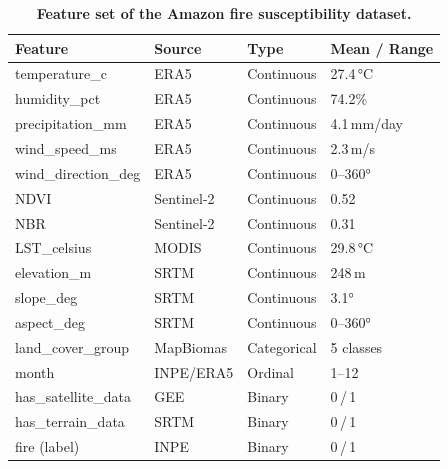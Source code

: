 \documentclass{ieeeaccess}
\begin{document}
\begin{table}[p]
\caption{\textbf{Feature set of the Amazon fire susceptibility dataset.}}
\label{tab:dataset}
\centering
\renewcommand{\arraystretch}{1.2}
\begin{tabularx}{\columnwidth}{|X|l|l|l|}
\hline
\textbf{Feature} & \textbf{Source} & \textbf{Type} & \textbf{Mean / Range} \\
\hline
temperature\_c       & ERA5        & Continuous  & 27.4\,°C      \\
\hline
humidity\_pct        & ERA5        & Continuous  & 74.2\%        \\
\hline
precipitation\_mm    & ERA5        & Continuous  & 4.1\,mm/day   \\
\hline
wind\_speed\_ms      & ERA5        & Continuous  & 2.3\,m/s      \\
\hline
wind\_direction\_deg & ERA5        & Continuous  & 0--360°       \\
\hline
NDVI                 & Sentinel-2  & Continuous  & 0.52          \\
\hline
NBR                  & Sentinel-2  & Continuous  & 0.31          \\
\hline
LST\_celsius         & MODIS       & Continuous  & 29.8\,°C      \\
\hline
elevation\_m         & SRTM        & Continuous  & 248\,m        \\
\hline
slope\_deg           & SRTM        & Continuous  & 3.1°          \\
\hline
aspect\_deg          & SRTM        & Continuous  & 0--360°       \\
\hline
land\_cover\_group   & MapBiomas   & Categorical & 5 classes     \\
\hline
month                & INPE/ERA5   & Ordinal     & 1--12         \\
\hline
has\_satellite\_data & GEE         & Binary      & 0\,/\,1       \\
\hline
has\_terrain\_data   & SRTM        & Binary      & 0\,/\,1       \\
\hline
fire (label)         & INPE        & Binary      & 0\,/\,1       \\
\hline
\end{tabularx}
\end{table}
\end{document}

